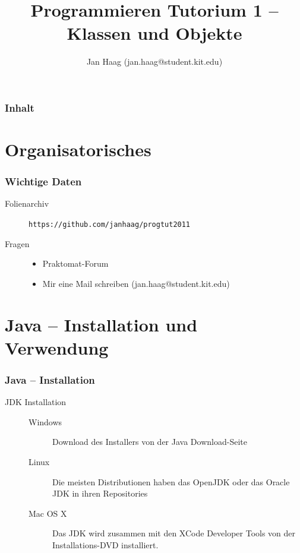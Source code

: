 \documentclass{beamer}
\author{Jan Haag (jan.haag@student.kit.edu)}
\title{Programmieren Tutorium 1 -- Klassen und Objekte}
\institute{Institut f\"{u}r Theoretische Informatik}
\begin{document}
\begin{frame}
\maketitle
\end{frame}

\begin{frame}
\frametitle{Inhalt}
\tableofcontents
\end{frame}

\section{Organisatorisches}
\begin{frame}[fragile]
\frametitle{Wichtige Daten}
\begin{description}
\item[Folienarchiv] \verb|https://github.com/janhaag/progtut2011|
\item[Fragen]
\begin{itemize}
\item Praktomat-Forum
\item Mir eine Mail schreiben (jan.haag@student.kit.edu)
\end{itemize}
\end{description}
\end{frame}

\section{Java -- Installation und Verwendung}
\begin{frame}[fragile]
\frametitle{Java -- Installation}
\begin{description}
\item[JDK Installation]
\begin{description}
\item[Windows] Download des Installers von der Java Download-Seite
\item[Linux] Die meisten Distributionen haben das OpenJDK oder das Oracle JDK in ihren Repositories
\item[Mac OS X] Das JDK wird zusammen mit den XCode Developer Tools von der Installations-DVD installiert.
\end{description}
\end{description}
\end{frame}
\end{document}
